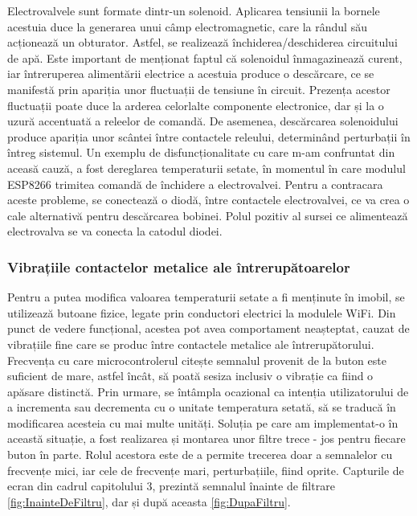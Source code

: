 	Electrovalvele sunt formate dintr-un solenoid. Aplicarea tensiunii la bornele acestuia duce la generarea unui câmp electromagnetic, care la rândul său acționează un obturator. Astfel, se realizează închiderea/deschiderea circuitului de apă. Este important de menționat faptul că solenoidul înmagazinează curent, iar întreruperea alimentării electrice a acestuia produce o descărcare, ce se manifestă prin apariția unor fluctuații de tensiune în circuit. Prezența acestor fluctuații poate duce la arderea celorlalte componente electronice, dar și la o uzură accentuată a releelor de comandă. De asemenea, descărcarea solenoidului produce apariția unor scântei între contactele releului, determinând perturbații în întreg sistemul. Un exemplu de disfuncționalitate cu care m-am confruntat din aceasă cauză, a fost dereglarea temperaturii setate, în momentul în care modulul ESP8266 trimitea comandă de închidere a electrovalvei. Pentru a contracara aceste probleme, se conectează o diodă, între contactele electrovalvei, ce va crea o cale alternativă pentru descărcarea bobinei. Polul pozitiv al sursei ce alimentează electrovalva se va conecta la catodul diodei.  

\subsubsection{Vibrațiile contactelor metalice ale întrerupătoarelor}

	Pentru a putea modifica valoarea temperaturii setate a fi menținute în imobil, se utilizează butoane fizice, legate prin conductori electrici la modulele WiFi. Din punct de vedere funcțional, acestea pot avea comportament neașteptat, cauzat de vibrațiile fine care se produc între contactele metalice ale întrerupătorului. Frecvența cu care microcontrolerul citește semnalul provenit de la buton este suficient de mare, astfel încât, să poată sesiza inclusiv o vibrație ca fiind o apăsare distinctă. Prin urmare, se întâmpla ocazional ca intenția utilizatorului de a incrementa sau decrementa cu o unitate temperatura setată, să se traducă în modificarea acesteia cu mai multe unități. Soluția pe care am implementat-o în această situație, a fost realizarea și montarea unor filtre trece - jos pentru fiecare buton în parte. Rolul acestora este de a permite trecerea doar a semnalelor cu frecvențe mici, iar cele de frecvențe mari, perturbațiile, fiind oprite. Capturile de ecran din cadrul capitolului 3, prezintă semnalul înainte de filtrare \ref{fig:InainteDeFiltru}, dar și după aceasta \ref{fig:DupaFiltru}.

